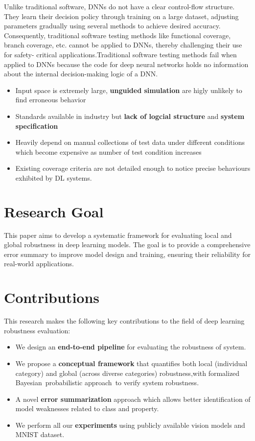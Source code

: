 \documentclass[10pt, conference, a4paper, final]{IEEEtran}
\begin{document}
Unlike traditional software, DNNs do not have a clear control-flow structure. They learn their decision policy through training on a large dataset, adjusting parameters gradually using several methods to achieve desired accuracy. Consequently, traditional software testing methods like functional coverage, branch coverage, etc. cannot be applied to DNNs, thereby challenging their use for safety- critical applications.Traditional software testing methods fail when applied to DNNs because the code for deep neural networks holds no information about the internal decision-making logic of a DNN.
\begin{itemize}
    \item Input space is extremely large, \textbf{unguided simulation} are higly unlikely to find erroneous behavior
    \item Standards available in industry but \textbf{lack of logcial structure} and \textbf{system specification}  
     \item Heavily depend on manual collections of test data under different conditions which become expensive as number of test condition increases
     \item  Existing coverage criteria are not detailed enough to notice precise behaviours exhibited by DL systems.
\end{itemize}

\section{Research Goal}
This paper aims to develop a systematic framework for evaluating local and global robustness in deep learning models. 
The goal is to provide a comprehensive error summary to improve model design and training, ensuring their reliability for real-world applications.

\section{Contributions}
This research makes the following key contributions to the field of deep learning robustness evaluation:
\begin{itemize}
   
    \item We design an \textbf{end-to-end pipeline} for evaluating the robustness of system.
    
    \item We propose a \textbf{conceptual framework} that quantifies both local (individual category) and global (across diverse categories) robustness,with formalized Bayesian probabilistic approach to verify system robustness.
    \item A novel \textbf{error summarization}  approach which allows better identification of model weaknesses related to class and property.

    \item We perform all our \textbf{experiments} using publicly available vision models and MNIST dataset.
\end{itemize}
\end{document}
